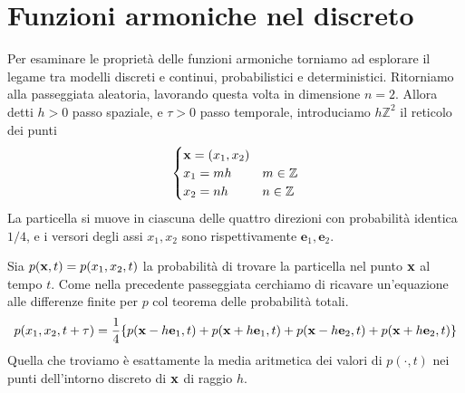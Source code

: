 \section{Funzioni armoniche nel discreto}

Per esaminare le proprietà delle funzioni armoniche torniamo ad esplorare il legame tra modelli discreti e continui, probabilistici e deterministici. Ritorniamo alla passeggiata aleatoria, lavorando questa volta in dimensione $n=2$. Allora detti $h >0$ passo spaziale, e $\displaystyle \tau  >0$ passo temporale, introduciamo $\displaystyle h\mathbb{Z}^{2}$ il reticolo dei punti
\begin{equation*}
    \begin{cases}
        \mathbf{x}=(x_{1},x_{2}) &                 \\
        x_{1} =mh        & m\in \mathbb{Z} \\
        x_{2} =nh        & n\in \mathbb{Z}
    \end{cases}
\end{equation*}
La particella si muove in ciascuna delle quattro direzioni con probabilità identica $1/4$, e i versori degli assi $\displaystyle x_{1},x_{2}$ sono rispettivamente $\displaystyle \mathbf{e}_{1},\mathbf{e}_{2}$.

Sia $\displaystyle p(\mathbf{x},t) =p(x_{1},x_{2},t)$ la probabilità di trovare la particella nel punto $\mathbf{x}$ al tempo $t$. Come nella precedente passeggiata cerchiamo di ricavare un'equazione alle differenze finite per $p$ col teorema delle probabilità totali.
\begin{equation*}
    p(x_{1},x_{2},t+\tau) =\frac{1}{4}\{p(\mathbf{x}-h\mathbf{e}_{1},t) +p(\mathbf{x}+h\mathbf{e}_{1},t) +p(\mathbf{x}-h\mathbf{e}_{2},t) +p(\mathbf{x}+h\mathbf{e}_{2},t)\}
\end{equation*}
Quella che troviamo è esattamente la media aritmetica dei valori di $p(\cdotp,t)$ nei punti dell'intorno discreto di $\mathbf{x}$ di raggio $h$.

